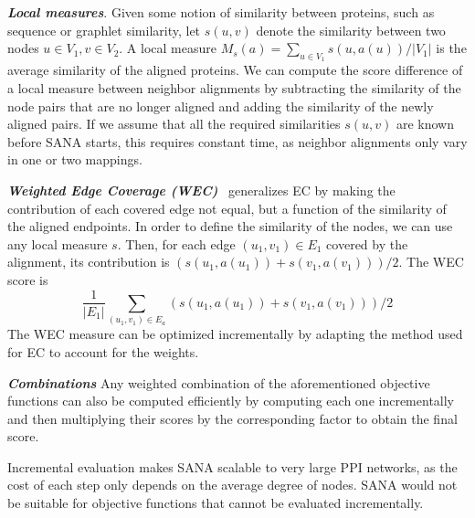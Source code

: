 \documentclass{bioinfo}
\begin{document}
\begin{methods}
\emph{\textbf{Local measures}}. Given some notion of similarity between proteins, such as sequence or graphlet similarity, let $s(u,v)$ denote the similarity between two nodes $u\in V_1, v\in V_2$. A local measure
$M_s(a)=\sum_{u\in V_1} s(u,a(u))/|V_1|$
is the average similarity of the aligned proteins.
We can compute the score difference of a local measure between neighbor alignments by subtracting the similarity of the node pairs that are no longer aligned and adding the similarity of the newly aligned pairs. If we assume that all the required similarities $s(u,v)$ are known before SANA starts, this requires constant time, as neighbor alignments only vary in one or two mappings.

\emph{\textbf{Weighted Edge Coverage (WEC)}}~\citep{WAVE} generalizes EC by making the contribution of each covered edge not equal, but a function of the similarity of the aligned endpoints. In order to define the similarity of the nodes, we can use any local measure $s$. Then, for each edge $(u_1,v_1)\in E_1$ covered by the alignment, its contribution is $\left(s(u_1,a(u_1))+s(v_1,a(v_1))\right)/2$. The WEC score is
$$\frac{1}{|E_1|}\sum_{(u_1,v_1)\in E_a} \left(s(u_1,a(u_1))+s(v_1,a(v_1))\right)/2$$
The WEC measure can be optimized incrementally by adapting the method used for EC to account for the weights.

\emph{\textbf{Combinations}} Any weighted combination of the aforementioned objective functions can also be computed efficiently by computing each one incrementally and then multiplying their scores by the corresponding factor to obtain the final score.

Incremental evaluation makes SANA scalable to very large PPI networks, as the cost of each step only depends on the average degree of nodes. SANA would not be suitable for objective functions that cannot be evaluated incrementally.



\end{methods}
\end{document}
